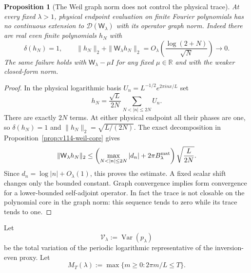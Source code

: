 \documentclass[11pt]{article}
\newtheorem{proposition}[theorem]{Proposition}
\theoremstyle{remark}
\begin{document}
\begin{proposition}[The Weil graph norm does not control the physical trace]
\label{prop:v118-graph-trace}
At every fixed $\lambda>1$, physical endpoint evaluation on finite
Fourier polynomials has no continuous extension to
$\mathcal D(\mathsf W_\lambda)$ with its operator graph norm.
Indeed there are real even finite polynomials $h_N$ with
\[
 \delta(h_N)=1,\qquad
 \|h_N\|_2+\|\mathsf W_\lambda h_N\|_2
       =O_\lambda\!\left(\frac{\log(2+N)}{\sqrt N}\right)\longrightarrow0.
\]
The same failure holds with $\mathsf W_\lambda-\mu I$ for any fixed
$\mu\in\mathbb R$ and with the weaker closed-form norm.
\end{proposition}
\begin{proof}
In the physical logarithmic basis $U_n=L^{-1/2}e^{2\pi inx/L}$ set
\[
 h_N=\frac{\sqrt L}{2N}\sum_{N<|n|\le2N}U_n.
\]
There are exactly $2N$ terms. At either physical endpoint all their
phases are one, so $\delta(h_N)=1$ and
$\|h_N\|_2=\sqrt{L/(2N)}$. The exact decomposition in
Proposition~\ref{prop:v114-weil-core} gives
\[
 \|\mathsf W_\lambda h_N\|_2
 \le\left(\max_{N<|n|\le2N}|d_n|
              +2\pi B_\lambda^{\rm mat}\right)\sqrt{\frac L{2N}}.
\]
Since $d_n=\log|n|+O_\lambda(1)$, this proves the estimate.
A fixed scalar shift changes only the bounded constant. Graph convergence
implies form convergence for a lower-bounded self-adjoint operator.
In fact the trace is not closable on the polynomial core in the graph
norm: this sequence tends to zero while its trace tends to one.
\end{proof}

Let
\[
 \mathcal V_\lambda:=\operatorname{Var}(p_\lambda)
\]
be the total variation of the periodic logarithmic representative of the
inversion-even proxy.  Let
\[
 M_T(\lambda):=\max\{m\ge0:2\pi m/L\le T\}.
\]
\end{document}
